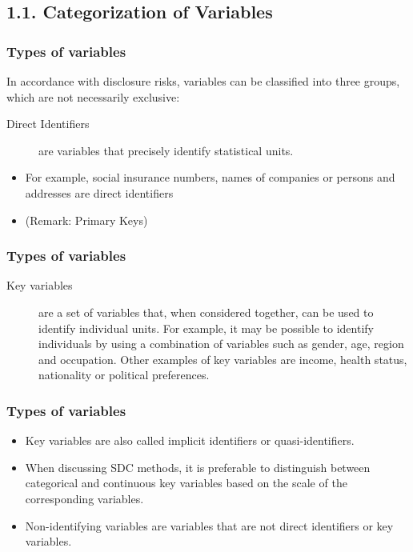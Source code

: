 \documentclass{beamer}
\begin{document}
\subsection*{1.1. Categorization of Variables}
\begin{frame}
\frametitle{Types of variables}

In accordance with disclosure risks, variables can be classiﬁed into three groups,
which are not necessarily exclusive:

\bigskip
\begin{description}
	\item[Direct Identifiers] are variables that precisely identify statistical units. 
\end{description}

\begin{itemize}
	\item For example, social insurance numbers, names of companies or persons and addresses
	are direct identiﬁers 
	\item (Remark: Primary Keys)
\end{itemize}
\end{frame}
\begin{frame}
\frametitle{Types of variables}
\begin{description}
	\item[Key variables] are a set of variables that, when considered together, can be used
	to identify individual units. For example, it may be possible to identify
	individuals by using a combination of variables such as gender, age, region
	and occupation. Other examples of key variables are income, health status,
	nationality or political preferences. 
\end{description}
\end{frame}
\begin{frame}
	\frametitle{Types of variables}
\begin{itemize}
	\item Key variables are also called implicit
	identiﬁers or quasi-identifiers. \item When discussing SDC methods, it is preferable
	to distinguish between categorical and continuous key variables based on the
	scale of the corresponding variables.
	\item Non-identifying variables are variables that are not direct identiﬁers or key variables.
\end{itemize}
\end{frame}
\end{document}
